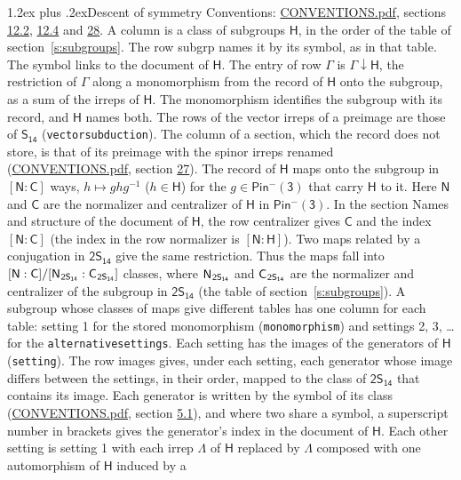 \documentclass[10pt,a4paper]{article}
\makeatletter
\renewcommand\section{\@startsection{section}{1}{\z@}{-3ex plus -1ex minus -.2ex}%
  {1.2ex plus .2ex}{\normalfont\large\sffamily\bfseries\color{parttitle}}}
\numberwithin{equation}{section}
\newcommand{\grp}[1]{\mathsf{#1}}
\newcommand{\grpindex}[2]{[#1 : #2]}
\newcommand{\restr}[2]{#1\!\downarrow#2}
\newcommand{\hairsp}{\mkern1mu}
\makeatother
\begin{document}
\section{Descent of symmetry}\label{s:subduction}
Conventions: \href{../../CONVENTIONS.pdf}{CONVENTIONS.pdf}, sections \href{../../../rotation/CONVENTIONS.pdf\#conv.12.2}{12.2}, \href{../../../rotation/CONVENTIONS.pdf\#conv.12.4}{12.4} and \href{../../CONVENTIONS.pdf\#conv.28}{28}.
A column is a class of subgroups $\grp{H}$, in the order of the table of section~\ref{s:subgroups}. The row subgrp names it by its symbol, as in that table. The symbol links to the document of $\grp{H}$. The entry of row $\Gamma$ is $\restr{\Gamma}{\grp{H}}$, the restriction of $\Gamma$ along a monomorphism from the record of $\grp{H}$ onto the subgroup, as a sum of the irreps of $\grp{H}$. The monomorphism identifies the subgroup with its record, and $\grp{H}$ names both. The rows of the vector irreps of a preimage are those of \href{../../../rotation/data/pdf/S14.pdf}{$\grp{S_{14}}$} (\texttt{vectorsubduction}). The column of a section, which the record does not store, is that of its preimage with the spinor irreps renamed (\href{../../CONVENTIONS.pdf}{CONVENTIONS.pdf}, section \href{../../CONVENTIONS.pdf\#conv.27}{27}). \label{n:group.normalizer.o3}\label{n:group.centralizer.o3}\label{n:element.h}The record of $\grp{H}$ maps onto the subgroup in $\grpindex{\grp{N}}{\grp{C}}$ ways, $h \mapsto g h g^{-1}$ ($h \in \grp{H}$) for the $g \in \grp{Pin^{-}(3)}$ that carry $\grp{H}$ to it. Here $\grp{N}$ and $\grp{C}$ are the normalizer and centralizer of $\grp{H}$ in \href{Pinminus3.pdf}{$\grp{Pin^{-}(3)}$}. In the section Names and structure of the document of $\grp{H}$, the row centralizer gives $\grp{C}$ and the index $\grpindex{\grp{N}}{\grp{C}}$ (the index in the row normalizer is $\grpindex{\grp{N}}{\grp{H}}$). Two maps related by a conjugation in $\grp{2S_{14}}$ give the same restriction. Thus the maps fall into $\grpindex{\grp{N}}{\grp{C}}/\grpindex{\grp{N}_{\hairsp \grp{2S_{14}}}}{\grp{C}_{\hairsp \grp{2S_{14}}}}$ classes, where $\grp{N}_{\hairsp \grp{2S_{14}}}$ and $\grp{C}_{\hairsp \grp{2S_{14}}}$ are the normalizer and centralizer of the subgroup in $\grp{2S_{14}}$ (the table of section~\ref{s:subgroups}). \label{n:head.setting}A subgroup whose classes of maps give different tables has one column for each table: setting 1 for the stored monomorphism (\texttt{monomorphism}) and settings 2, 3, \dots{} for the \texttt{alternativesettings}. Each setting has the images of the generators of $\grp{H}$ (\texttt{setting}). \label{n:head.images}The row images gives, under each setting, each generator whose image differs between the settings, in their order, mapped to the class of $\grp{2S_{14}}$ that contains its image. Each generator is written by the symbol of its class (\href{../../CONVENTIONS.pdf}{CONVENTIONS.pdf}, section \href{../../../rotation/CONVENTIONS.pdf\#conv.5.1}{5.1}), and where two share a symbol, a superscript number in brackets gives the generator's index in the document of $\grp{H}$. \label{n:irrep.Delta}Each other setting is setting 1 with each irrep $\Lambda$ of $\grp{H}$ replaced by $\Lambda$ composed with one automorphism of $\grp{H}$ induced by a 
\end{document}
